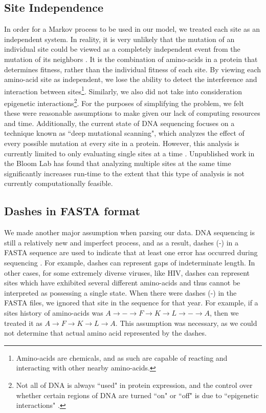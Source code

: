 \documentclass[12pt]{article}
\begin{document}
\begin{multicols}{2}
\subsection{Site Independence}
In order for a Markov process to be used in our model, we treated each site as an independent system. In reality, it is very unlikely that the mutation of an individual site could be viewed as a completely independent event from the mutation of its neighbors \citep{fowler2014deep}. It is the combination of amino-acids in a protein that determines fitness, rather than the individual fitness of each site. By viewing each amino-acid site as independent, we lose the ability to detect the interference and interaction between sites\footnote{Amino-acids are chemicals, and as such are capable of reacting and interacting with other nearby amino-acids.}. Similarly, we also did not take into consideration epigenetic interactions\footnote{Not all of DNA is always ``used" in protein expression, and the control over whether certain regions of DNA are turned ``on" or ``off" is due to ``epigenetic interactions" \citep{liu2008gene}.}. For the purposes of simplifying the problem, we felt these were reasonable assumptions to make given our lack of computing resources and time. Additionally, the current state of DNA sequencing focuses on a technique known as ``deep mutational scanning", which analyzes the effect of every possible mutation at every site in a protein. However, this analysis is currently limited to only evaluating single sites at a time \citep{fowler2014deep}. Unpublished work in the Bloom Lab has found that analyzing multiple sites at the same time significantly increases run-time to the extent that this type of analysis is not currently computationally feasible.

\subsection{Dashes in FASTA format}
We made another major assumption when parsing our data. DNA sequencing is still a relatively new and imperfect process, and as a result, dashes (-) in a FASTA sequence are used to indicate that at least one error has occurred during sequencing \citep{harris2008single}. For example, dashes can represent gaps of indeterminate length. In other cases, for some extremely diverse viruses, like HIV, dashes can represent sites which have exhibited several different amino-acids and thus cannot be interpreted as possessing a single state. When there were dashes (-) in the FASTA files, we ignored that site in the sequence for that year. For example, if a sites history of amino-acids was $A \rightarrow - \rightarrow F \rightarrow K \rightarrow L \rightarrow - \rightarrow A$, then we treated it as $A \rightarrow F \rightarrow K \rightarrow L \rightarrow A$. This assumption was necessary, as we could not determine that actual amino acid represented by the dashes.


\end{multicols}
\end{document}

